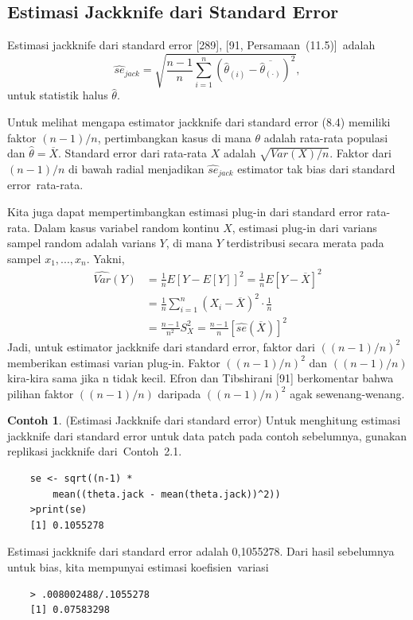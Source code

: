 \documentclass[a4paper,12pt]{article}
\theoremstyle{definition}
\newtheorem{example}{Contoh}[section]
\begin{document}
\subsection{Estimasi Jackknife dari Standard Error}
Estimasi jackknife dari standard error [289], [91, Persamaan (11.5)] adalah
\begin{equation}
\widehat{se}_{jack} = \sqrt{\frac{n-1}{n}\sum_{i=1}^{n}\left(\hat{\theta}_{(i)}-\overline{\hat{\theta}_{(\cdot)}}\right)^{2}},
\end{equation}
untuk statistik halus $\hat{\theta}$.

Untuk melihat mengapa estimator jackknife dari standard error (8.4) memiliki faktor $(n-1)/n$, pertimbangkan kasus di mana $\theta$ adalah rata-rata populasi dan $\hat{\theta} = \overline{X}$. Standard error dari rata-rata $X$ adalah $\sqrt{Var(X)/n}$.  Faktor dari $(n-1)/n$ di bawah radial menjadikan $\widehat{se}_{jack}$ estimator tak bias dari standard error rata-rata.

Kita juga dapat mempertimbangkan estimasi plug-in dari standard error rata-rata.  Dalam kasus variabel random kontinu $X$, estimasi plug-in dari varians sampel random adalah varians $Y$, di mana $Y$ terdistribusi secara merata pada sampel $x_{1}, ...,x_{n}$. Yakni,
\begin{equation*}
    \begin{split}
        \widehat{Var}(Y) &= \frac{1}{n}E[Y-E[Y]]^{2} = \frac{1}{n}E[Y-\overline{X}]^{2}\\
        &= \frac{1}{n}\sum_{i=1}^{n}(X_{i}-\overline{X})^{2}\cdot\frac{1}{n}\\
        &=\frac{n-1}{n^{2}}S_{X}^{2} = \frac{n-1}{n}[\widehat{se}(\overline{X})]^{2}
    \end{split}
\end{equation*}
Jadi, untuk estimator jackknife dari standard error, faktor dari $((n-1)/n)^{2}$ memberikan estimasi varian plug-in.  Faktor $((n-1)/n)^{2}$ dan $((n-1)/n)$ kira-kira sama jika n tidak kecil. Efron dan Tibshirani [91] berkomentar bahwa pilihan faktor $((n-1)/n)$ daripada $((n-1)/n)^{2}$ agak sewenang-wenang.
\begin{example}(Estimasi Jackknife dari standard error)
Untuk menghitung estimasi jackknife dari standard error untuk data patch pada contoh sebelumnya, gunakan replikasi jackknife dari Contoh 2.1.
\begin{lstlisting}
    se <- sqrt((n-1) *
        mean((theta.jack - mean(theta.jack))^2))
    >print(se)
    [1] 0.1055278
\end{lstlisting}
Estimasi jackknife dari standard error adalah 0,1055278.  Dari hasil sebelumnya untuk bias, kita mempunyai estimasi koefisien variasi
\begin{lstlisting}
    > .008002488/.1055278
    [1] 0.07583298
\end{lstlisting}
\end{example}
\end{document}
